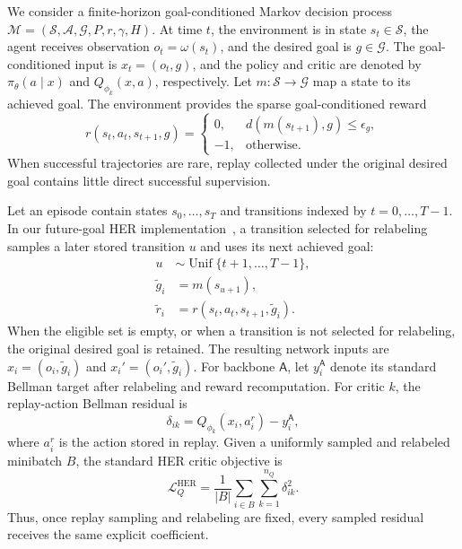 \documentclass[letterpaper]{article}
\begin{document}
We consider a finite-horizon goal-conditioned Markov decision process
\(\mathcal M=(\mathcal S,\mathcal A,\mathcal G,P,r,\gamma,H)\).
At time \(t\), the environment is in state \(s_t\in\mathcal S\), the
agent receives observation \(o_t=\omega(s_t)\), and the desired goal is
\(g\in\mathcal G\).  The goal-conditioned input is \(x_t=(o_t,g)\), and
the policy and critic are denoted by
\(\pi_\theta(a\mid x)\) and \(Q_{\phi_k}(x,a)\), respectively.  Let
\(m:\mathcal S\rightarrow\mathcal G\) map a state to its achieved goal.
The environment provides the sparse goal-conditioned reward
\begin{equation}
r(s_t,a_t,s_{t+1},g)=
\begin{cases}
0, & d\!\left(m(s_{t+1}),g\right)\leq\epsilon_g,\\
-1, & \text{otherwise}.
\end{cases}
\end{equation}
When successful trajectories are rare, replay collected under the
original desired goal contains little direct successful supervision.

Let an episode contain states \(s_0,\ldots,s_T\) and transitions
indexed by \(t=0,\ldots,T-1\). In our future-goal HER
implementation~\citep{andrychowicz2017her}, a transition selected for
relabeling samples a later stored transition \(u\) and uses its next
achieved goal:
\begin{equation}
\begin{aligned}
u &\sim \operatorname{Unif}\{t+1,\ldots,T-1\},\\
\tilde g_i &= m(s_{u+1}),\\
\tilde r_i &= r(s_t,a_t,s_{t+1},\tilde g_i).
\end{aligned}
\end{equation}
When the eligible set is empty, or when a transition is not selected
for relabeling, the original desired goal is retained. The resulting network inputs are
\(x_i=(o_i,\tilde g_i)\) and \(x_i'=(o_i',\tilde g_i)\).  For backbone
\(\mathsf A\), let \(y_i^{\mathsf A}\) denote its standard Bellman
target after relabeling and reward recomputation.  For critic \(k\),
the replay-action Bellman residual is
\begin{equation}
\delta_{ik}
=Q_{\phi_k}(x_i,a_i^r)-y_i^{\mathsf A},
\end{equation}
where \(a_i^r\) is the action stored in replay.  Given a uniformly
sampled and relabeled minibatch \(B\), the standard HER critic
objective is
\begin{equation}
\mathcal L_Q^{\mathrm{HER}}
=\frac{1}{|B|}
\sum_{i\in B}\sum_{k=1}^{n_Q}\delta_{ik}^{2}.
\end{equation}
Thus, once replay sampling and relabeling are fixed, every sampled
residual receives the same explicit coefficient.
\end{document}
